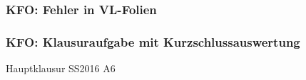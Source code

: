 \documentclass[18pt]{beamer}
\begin{document}
	\begin{frame}
		\frametitle{KFO: Fehler in VL-Folien}
		\begin{figure}
		\end{figure}
\end{frame}

	\begin{frame}
		\frametitle{KFO: Klausuraufgabe mit Kurzschlussauswertung}
		\begin{huge}
			\centering Hauptklausur SS2016 A6
		\end{huge}
	\end{frame}
\end{document}
